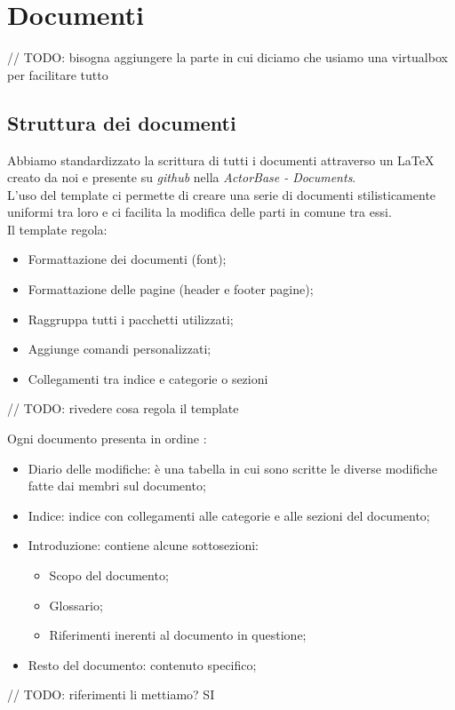 \section{Documenti}
	// TODO: bisogna aggiungere la parte in cui diciamo che usiamo una virtualbox per facilitare tutto

\subsection{Struttura dei documenti}
Abbiamo standardizzato la scrittura di tutti i documenti attraverso un  \LaTeX\xspace creato da noi e presente su \textit{github} nella  \textit{ActorBase - Documents}.\\
L'uso del template ci permette di creare una serie di documenti stilisticamente uniformi tra loro e ci facilita la modifica delle parti in comune tra essi.\\
Il template regola:
\begin{itemize}
\item Formattazione dei documenti (font);
\item Formattazione delle pagine (header e footer pagine);
\item Raggruppa tutti i pacchetti utilizzati;
\item Aggiunge comandi personalizzati;
\item Collegamenti tra indice e categorie o sezioni
\end{itemize}
	// TODO: rivedere cosa regola il template

Ogni documento presenta in ordine :
\begin{itemize}
\item Diario delle modifiche: è una tabella in cui sono scritte le diverse modifiche fatte dai membri sul documento;
\item Indice: indice con collegamenti alle categorie e alle sezioni del documento;
\item Introduzione: contiene alcune sottosezioni:
	\begin{itemize}
	\item Scopo del documento;
	\item Glossario;
	\item Riferimenti inerenti al documento in questione;
	\end{itemize}
\item Resto del documento: contenuto specifico;
\end{itemize}
	// TODO: riferimenti li mettiamo? SI


